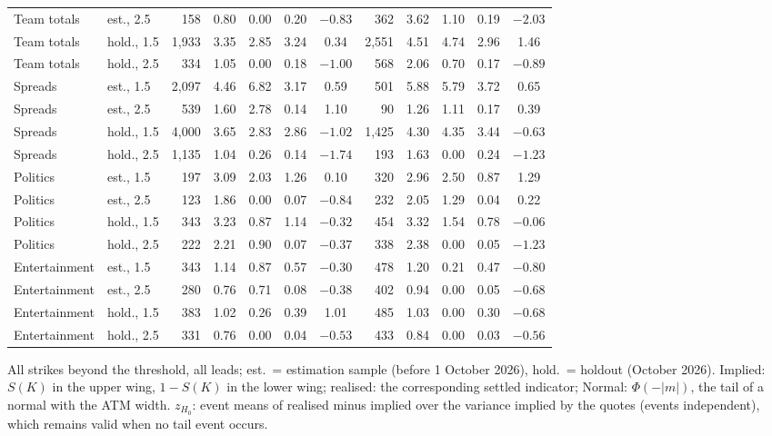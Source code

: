\begin{table}[ht]
\begin{threeparttable}
\begin{tabular}{@{}llrccccrcccc@{}}
Team totals & est., 2.5 & 158 & 0.80 & 0.00 & 0.20 & $-0.83$ & 362 & 3.62 & 1.10 & 0.19 & $-2.03$ \\
Team totals & hold., 1.5 & 1,933 & 3.35 & 2.85 & 3.24 & 0.34 & 2,551 & 4.51 & 4.74 & 2.96 & 1.46 \\
Team totals & hold., 2.5 & 334 & 1.05 & 0.00 & 0.18 & $-1.00$ & 568 & 2.06 & 0.70 & 0.17 & $-0.89$ \\
Spreads & est., 1.5 & 2,097 & 4.46 & 6.82 & 3.17 & 0.59 & 501 & 5.88 & 5.79 & 3.72 & 0.65 \\
Spreads & est., 2.5 & 539 & 1.60 & 2.78 & 0.14 & 1.10 & 90 & 1.26 & 1.11 & 0.17 & 0.39 \\
Spreads & hold., 1.5 & 4,000 & 3.65 & 2.83 & 2.86 & $-1.02$ & 1,425 & 4.30 & 4.35 & 3.44 & $-0.63$ \\
Spreads & hold., 2.5 & 1,135 & 1.04 & 0.26 & 0.14 & $-1.74$ & 193 & 1.63 & 0.00 & 0.24 & $-1.23$ \\
Politics & est., 1.5 & 197 & 3.09 & 2.03 & 1.26 & 0.10 & 320 & 2.96 & 2.50 & 0.87 & 1.29 \\
Politics & est., 2.5 & 123 & 1.86 & 0.00 & 0.07 & $-0.84$ & 232 & 2.05 & 1.29 & 0.04 & 0.22 \\
Politics & hold., 1.5 & 343 & 3.23 & 0.87 & 1.14 & $-0.32$ & 454 & 3.32 & 1.54 & 0.78 & $-0.06$ \\
Politics & hold., 2.5 & 222 & 2.21 & 0.90 & 0.07 & $-0.37$ & 338 & 2.38 & 0.00 & 0.05 & $-1.23$ \\
Entertainment & est., 1.5 & 343 & 1.14 & 0.87 & 0.57 & $-0.30$ & 478 & 1.20 & 0.21 & 0.47 & $-0.80$ \\
Entertainment & est., 2.5 & 280 & 0.76 & 0.71 & 0.08 & $-0.38$ & 402 & 0.94 & 0.00 & 0.05 & $-0.68$ \\
Entertainment & hold., 1.5 & 383 & 1.02 & 0.26 & 0.39 & 1.01 & 485 & 1.03 & 0.00 & 0.30 & $-0.68$ \\
Entertainment & hold., 2.5 & 331 & 0.76 & 0.00 & 0.04 & $-0.53$ & 433 & 0.84 & 0.00 & 0.03 & $-0.56$ \\
\bottomrule
\end{tabular}
\begin{tablenotes}[flushleft]\footnotesize
\item All strikes beyond the threshold, all leads; est.\ = estimation sample (before 1 October
2026), hold.\ = holdout (October 2026). Implied: $S(K)$ in the upper wing, $1-S(K)$ in the lower
wing; realised: the corresponding settled indicator; Normal: $\Phi(-|m|)$, the tail of a normal
with the ATM width. $z_{H_0}$: event means of realised minus implied over the variance implied
by the quotes (events independent), which remains valid when no tail event occurs.
\end{tablenotes}
\end{threeparttable}
\end{table}

